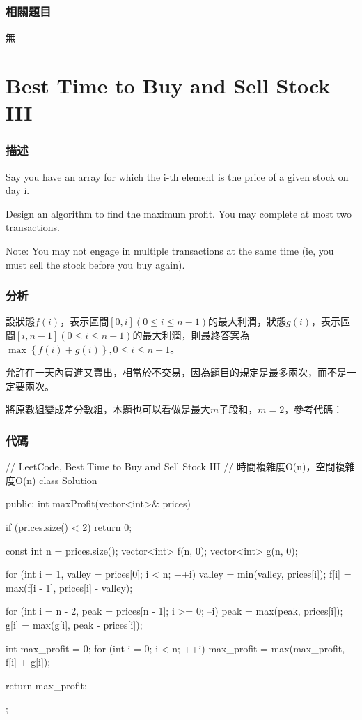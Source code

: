 \subsubsection{相關題目}

\begindot
\item 無
\myenddot


\section{Best Time to Buy and Sell Stock III} %
\label{sec:best-time-to-buy-and-sell-stock-iii}


\subsubsection{描述}
Say you have an array for which the i-th element is the price of a given stock on day i.

Design an algorithm to find the maximum profit. You may complete at most two transactions.

Note: You may not engage in multiple transactions at the same time (ie, you must sell the stock before you buy again).


\subsubsection{分析}
設狀態$f(i)$，表示區間$[0,i](0 \leq i \leq n-1)$的最大利潤，狀態$g(i)$，表示區間$[i, n-1](0 \leq i \leq n-1)$的最大利潤，則最終答案為$\max\left\{f(i)+g(i)\right\},0 \leq i \leq n-1$。

允許在一天內買進又賣出，相當於不交易，因為題目的規定是最多兩次，而不是一定要兩次。

將原數組變成差分數組，本題也可以看做是最大$m$子段和，$m=2$，參考代碼：

\subsubsection{代碼}
\begin{Code}
// LeetCode, Best Time to Buy and Sell Stock III
// 時間複雜度O(n)，空間複雜度O(n)
class Solution {
public:
    int maxProfit(vector<int>& prices) {
        if (prices.size() < 2) return 0;

        const int n = prices.size();
        vector<int> f(n, 0);
        vector<int> g(n, 0);

        for (int i = 1, valley = prices[0]; i < n; ++i) {
            valley = min(valley, prices[i]);
            f[i] = max(f[i - 1], prices[i] - valley);
        }

        for (int i = n - 2, peak = prices[n - 1]; i >= 0; --i) {
            peak = max(peak, prices[i]);
            g[i] = max(g[i], peak - prices[i]);
        }

        int max_profit = 0;
        for (int i = 0; i < n; ++i)
            max_profit = max(max_profit, f[i] + g[i]);

        return max_profit;
    }
};
\end{Code}


